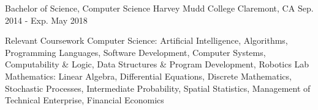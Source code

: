 

\begin{cventries}

  \cventry
    {Bachelor of Science, Computer Science} %
    {Harvey Mudd College} %
    {Claremont, CA} %
    {Sep. 2014 - Exp. May 2018} %
    {}

  \cventry
    {}
    {Relevant Coursework}
    {}
    {}
    {Computer Science: Artificial Intelligence, Algorithms, Programming Languages, Software Development, Computer Systems, Computability \& Logic, Data Structures \& Program Development, Robotics Lab
    Mathematics: Linear Algebra, Differential Equations, Discrete Mathematics, Stochastic Processes, Intermediate Probability, Spatial Statistics, Management of Technical Enterprise, Financial Economics}

\end{cventries}
